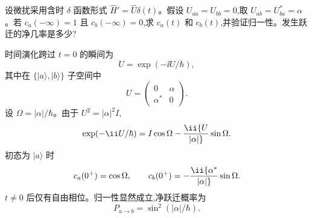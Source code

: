 \begin{question}
设微扰采用含时 $\delta$ 函数形式 $\hat H'=\hat U\delta(t)$。假设 $U_{aa}=U_{bb}=0$,取 $U_{ab}=U_{ba}^*=\alpha$。若 $c_a(-\infty)=1$ 且 $c_b(-\infty)=0$,求 $c_a(t)$ 和 $c_b(t)$,并验证归一性。发生跃迁的净几率是多少?
\begin{solution}
时间演化跨过 $t=0$ 的瞬间为
\[
U=\exp(-\ii U/\hbar),
\]
其中在 $\{|a\rangle,|b\rangle\}$ 子空间中
\[
U=\begin{pmatrix}0&\alpha\\ \alpha^*&0\end{pmatrix}.
\]
设 $\Omega=|\alpha|/\hbar$。由于 $U^2=|\alpha|^2 I$,
\[
\exp(-\ii U/\hbar)=I\cos\Omega-\ii {U\over|\alpha|}\sin\Omega.
\]
初态为 $|a\rangle$ 时
\[
c_a(0^+)=\cos\Omega,
\qquad
c_b(0^+)=-\ii {\alpha^*\over|\alpha|}\sin\Omega.
\]
$t\ne0$ 后仅有自由相位。归一性显然成立,净跃迁概率为
\[
\boxed{P_{a\to b}=\sin^2(|\alpha|/\hbar).}
\]
\end{solution}
\end{question}

